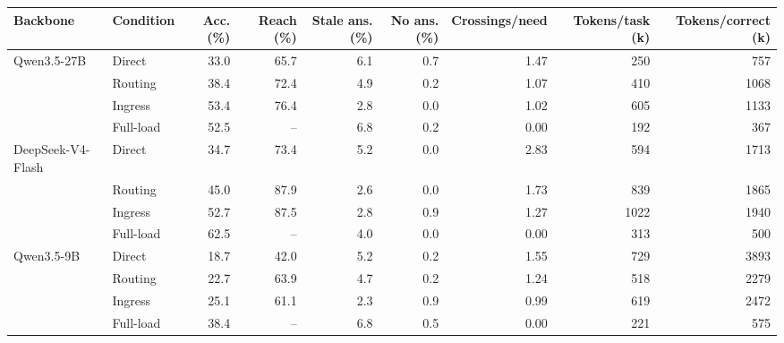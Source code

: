 \begin{tabular}{ll r r r r r r r}
\toprule
Backbone & Condition & Acc. (\%) & Reach (\%) & Stale ans. (\%) & No ans. (\%) & Crossings/need & Tokens/task (k) & Tokens/correct (k) \\
\midrule
Qwen3.5-27B & Direct & 33.0 & 65.7 & 6.1 & 0.7 & 1.47 & 250 & 757 \\
 & Routing & 38.4 & 72.4 & 4.9 & 0.2 & 1.07 & 410 & 1068 \\
 & Ingress & 53.4 & 76.4 & 2.8 & 0.0 & 1.02 & 605 & 1133 \\
 & Full-load & 52.5 & -- & 6.8 & 0.2 & 0.00 & 192 & 367 \\
\midrule
DeepSeek-V4-Flash & Direct & 34.7 & 73.4 & 5.2 & 0.0 & 2.83 & 594 & 1713 \\
 & Routing & 45.0 & 87.9 & 2.6 & 0.0 & 1.73 & 839 & 1865 \\
 & Ingress & 52.7 & 87.5 & 2.8 & 0.9 & 1.27 & 1022 & 1940 \\
 & Full-load & 62.5 & -- & 4.0 & 0.0 & 0.00 & 313 & 500 \\
\midrule
Qwen3.5-9B & Direct & 18.7 & 42.0 & 5.2 & 0.2 & 1.55 & 729 & 3893 \\
 & Routing & 22.7 & 63.9 & 4.7 & 0.2 & 1.24 & 518 & 2279 \\
 & Ingress & 25.1 & 61.1 & 2.3 & 0.9 & 0.99 & 619 & 2472 \\
 & Full-load & 38.4 & -- & 6.8 & 0.5 & 0.00 & 221 & 575 \\
\bottomrule
\end{tabular}